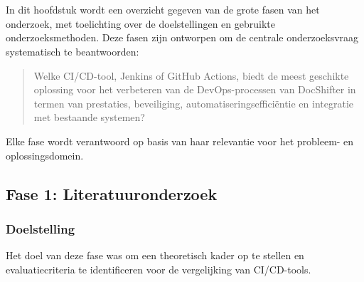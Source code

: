 
\chapter{}%
\label{ch:methodologie}


In dit hoofdstuk wordt een overzicht gegeven van de grote fasen van het onderzoek, met toelichting over de doelstellingen en gebruikte onderzoeksmethoden. Deze fasen zijn ontworpen om de centrale onderzoeksvraag systematisch te beantwoorden:

\begin{quote}
    Welke CI/CD-tool, Jenkins of GitHub Actions, biedt de meest geschikte oplossing voor het verbeteren van de DevOps-processen van DocShifter in termen van prestaties, beveiliging, automatiseringsefficiëntie en integratie met bestaande systemen?
\end{quote}

Elke fase wordt verantwoord op basis van haar relevantie voor het probleem- en oplossingsdomein.

\section{Fase 1: Literatuuronderzoek}
\subsection*{Doelstelling}
Het doel van deze fase was om een theoretisch kader op te stellen en evaluatiecriteria te identificeren voor de vergelijking van CI/CD-tools.

